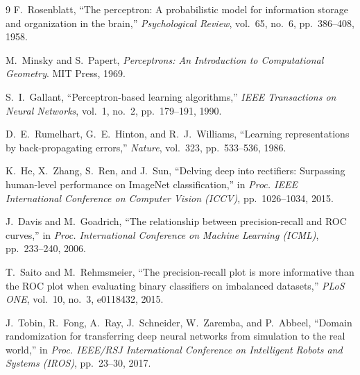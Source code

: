 \documentclass[10pt,twocolumn,a4paper]{article}
\begin{document}
\begin{thebibliography}{9}
\footnotesize
{}
F.~Rosenblatt, ``The perceptron: A probabilistic model for information storage and
organization in the brain,'' \emph{Psychological Review}, vol.~65, no.~6, pp.~386--408, 1958.

M.~Minsky and S.~Papert, \emph{Perceptrons: An Introduction to Computational Geometry}.
MIT Press, 1969.

S.~I.~Gallant, ``Perceptron-based learning algorithms,'' \emph{IEEE Transactions on Neural
Networks}, vol.~1, no.~2, pp.~179--191, 1990.

D.~E.~Rumelhart, G.~E.~Hinton, and R.~J.~Williams, ``Learning representations by
back-propagating errors,'' \emph{Nature}, vol.~323, pp.~533--536, 1986.

K.~He, X.~Zhang, S.~Ren, and J.~Sun, ``Delving deep into rectifiers: Surpassing human-level
performance on ImageNet classification,'' in \emph{Proc. IEEE International Conference on
Computer Vision (ICCV)}, pp.~1026--1034, 2015.

J.~Davis and M.~Goadrich, ``The relationship between precision-recall and ROC curves,'' in
\emph{Proc. International Conference on Machine Learning (ICML)}, pp.~233--240, 2006.

T.~Saito and M.~Rehmsmeier, ``The precision-recall plot is more informative than the ROC plot
when evaluating binary classifiers on imbalanced datasets,'' \emph{PLoS ONE}, vol.~10, no.~3,
e0118432, 2015.

J.~Tobin, R.~Fong, A.~Ray, J.~Schneider, W.~Zaremba, and P.~Abbeel, ``Domain randomization for
transferring deep neural networks from simulation to the real world,'' in \emph{Proc. IEEE/RSJ
International Conference on Intelligent Robots and Systems (IROS)}, pp.~23--30, 2017.
\end{thebibliography}
\end{document}
